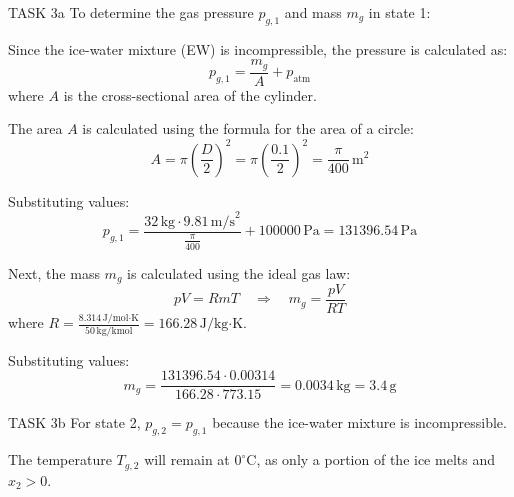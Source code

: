 TASK 3a  
To determine the gas pressure \( p_{g,1} \) and mass \( m_g \) in state 1:  

Since the ice-water mixture (EW) is incompressible, the pressure is calculated as:  
\[
p_{g,1} = \frac{m_g}{A} + p_{\text{atm}}
\]  
where \( A \) is the cross-sectional area of the cylinder.  

The area \( A \) is calculated using the formula for the area of a circle:  
\[
A = \pi \left( \frac{D}{2} \right)^2 = \pi \left( \frac{0.1}{2} \right)^2 = \frac{\pi}{400} \, \text{m}^2
\]  

Substituting values:  
\[
p_{g,1} = \frac{32 \, \text{kg} \cdot 9.81 \, \text{m/s}^2}{\frac{\pi}{400}} + 100000 \, \text{Pa} = 131396.54 \, \text{Pa}
\]  

Next, the mass \( m_g \) is calculated using the ideal gas law:  
\[
p V = R m T \quad \Rightarrow \quad m_g = \frac{p V}{R T}
\]  
where \( R = \frac{8.314 \, \text{J/mol·K}}{50 \, \text{kg/kmol}} = 166.28 \, \text{J/kg·K} \).  

Substituting values:  
\[
m_g = \frac{131396.54 \cdot 0.00314}{166.28 \cdot 773.15} = 0.0034 \, \text{kg} = 3.4 \, \text{g}
\]  

TASK 3b  
For state 2, \( p_{g,2} = p_{g,1} \) because the ice-water mixture is incompressible.  

The temperature \( T_{g,2} \) will remain at \( 0^\circ\text{C} \), as only a portion of the ice melts and \( x_2 > 0 \).